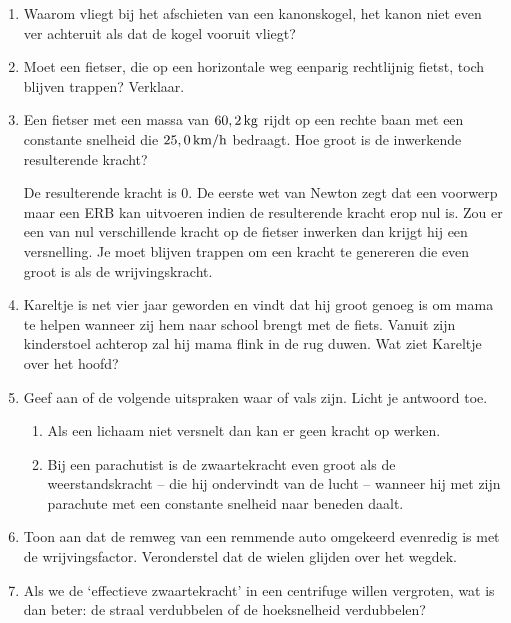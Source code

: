 \begin{enumerate}
\item Waarom vliegt bij het afschieten van een kanonskogel, het kanon niet even ver achteruit als dat de kogel vooruit vliegt?


\item Moet een fietser, die op een horizontale weg eenparig rechtlijnig fietst, toch blijven trappen? Verklaar.

\item Een fietser met een massa van $60,2\rm\,kg$ rijdt op een rechte baan met een constante snelheid die $25,0\rm\,km/h$ bedraagt. Hoe groot is de inwerkende resulterende kracht? 
\begin{oplossing}
De resulterende kracht is 0. De eerste wet van Newton zegt dat een voorwerp maar een ERB kan uitvoeren indien de resulterende kracht erop nul is. Zou er een van nul verschillende kracht op de fietser inwerken dan krijgt hij een versnelling. Je moet blijven trappen om een kracht te genereren die even groot is als de wrijvingskracht.
\end{oplossing}

\item Kareltje is net vier jaar geworden en vindt dat hij groot genoeg is om mama te helpen wanneer zij hem naar school brengt met de fiets. Vanuit zijn kinderstoel achterop zal hij mama flink in de rug duwen. Wat ziet Kareltje over het hoofd? 

\item Geef aan of de volgende uitspraken waar of vals zijn. Licht je antwoord toe.
\begin{enumerate}
\item Als een lichaam niet versnelt dan kan er geen kracht op werken. 
\item Bij een parachutist is de zwaartekracht even groot als de weerstandskracht -- die hij ondervindt van de lucht -- wanneer hij met zijn parachute met een constante snelheid naar beneden daalt. 
\end{enumerate}


\item Toon aan dat de remweg van een remmende auto omgekeerd
evenredig is met de wrijvingsfactor. Veronderstel dat de wielen
glijden over het wegdek.

\item Als we de `effectieve zwaartekracht' in een centrifuge willen vergroten, wat is dan beter: de straal verdubbelen of de hoeksnelheid verdubbelen?


\end{enumerate}
